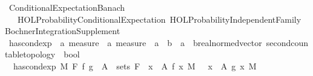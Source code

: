 %
\begin{isabellebody}%
%
%
\isadelimtheory
\isanewline
\isanewline
%
\endisadelimtheory
%
\isatagtheory
{}\isamarkupfalse%
\ Conditional{\isacharunderscore}{\kern0pt}Expectation{\isacharunderscore}{\kern0pt}Banach\isanewline
\ \ \ {\isachardoublequoteopen}HOL{\isacharminus}{\kern0pt}Probability{\isachardot}{\kern0pt}Conditional{\isacharunderscore}{\kern0pt}Expectation{\isachardoublequoteclose}\ {\isachardoublequoteopen}HOL{\isacharminus}{\kern0pt}Probability{\isachardot}{\kern0pt}Independent{\isacharunderscore}{\kern0pt}Family{\isachardoublequoteclose}\ Bochner{\isacharunderscore}{\kern0pt}Integration{\isacharunderscore}{\kern0pt}Supplement\isanewline
{}%
\endisatagtheory
{\isafoldtheory}%
%
\isadelimtheory
%
\endisadelimtheory
%
\isadelimdocument
%
\endisadelimdocument
%
\isatagdocument
%
\isamarkuptrue%
%
\endisatagdocument
{\isafolddocument}%
%
\isadelimdocument
%
\endisadelimdocument
{}\isamarkupfalse%
\ has{\isacharunderscore}{\kern0pt}cond{\isacharunderscore}{\kern0pt}exp\ {\isacharcolon}{\kern0pt}{\isacharcolon}{\kern0pt}\ {\isachardoublequoteopen}{\isacharprime}{\kern0pt}a\ measure\ {\isasymRightarrow}\ {\isacharprime}{\kern0pt}a\ measure\ {\isasymRightarrow}\ {\isacharparenleft}{\kern0pt}{\isacharprime}{\kern0pt}a\ {\isasymRightarrow}\ {\isacharprime}{\kern0pt}b{\isacharparenright}{\kern0pt}\ {\isasymRightarrow}\ {\isacharparenleft}{\kern0pt}{\isacharprime}{\kern0pt}a\ {\isasymRightarrow}\ {\isacharprime}{\kern0pt}b{\isacharcolon}{\kern0pt}{\isacharcolon}{\kern0pt}{\isacharbraceleft}{\kern0pt}real{\isacharunderscore}{\kern0pt}normed{\isacharunderscore}{\kern0pt}vector{\isacharcomma}{\kern0pt}\ second{\isacharunderscore}{\kern0pt}countable{\isacharunderscore}{\kern0pt}topology{\isacharbraceright}{\kern0pt}{\isacharparenright}{\kern0pt}\ {\isasymRightarrow}\ bool{\isachardoublequoteclose}\ \ \isanewline
\ \ {\isachardoublequoteopen}has{\isacharunderscore}{\kern0pt}cond{\isacharunderscore}{\kern0pt}exp\ M\ F\ f\ g\ {\isacharequal}{\kern0pt}\ {\isacharparenleft}{\kern0pt}{\isacharparenleft}{\kern0pt}{\isasymforall}A\ {\isasymin}\ sets\ F{\isachardot}{\kern0pt}\ {\isacharparenleft}{\kern0pt}{\isasymintegral}\ x\ {\isasymin}\ A{\isachardot}{\kern0pt}\ f\ x\ {\isasympartial}M{\isacharparenright}{\kern0pt}\ {\isacharequal}{\kern0pt}\ {\isacharparenleft}{\kern0pt}{\isasymintegral}\ x\ {\isasymin}\ A{\isachardot}{\kern0pt}\ g\ x\ {\isasympartial}M{\isacharparenright}{\kern0pt}{\isacharparenright}{\kern0pt}\isanewline

\end{isabellebody}
